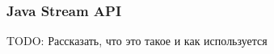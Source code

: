 \begin{frame}
\frametitle{Java Stream API} %
TODO: Рассказать, что это такое и как используется
\end{frame}